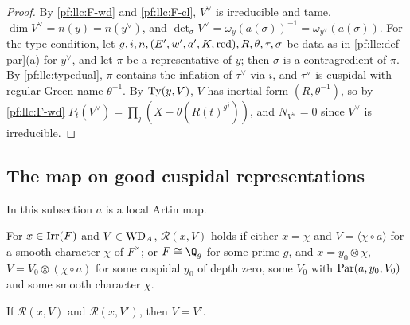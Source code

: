 \begin{proof}
By \ref{pf:llc:F-wd} and \ref{pf:llc:F-cl}, $V^\vee$ is irreducible and tame, $\dim V^\vee=n(y)=n(y^\vee)$, and
$\det_\sigma V^\vee=\omega_y(a(\sigma))^{-1}=\omega_{y^\vee}(a(\sigma))$. For the type condition, let
$g,i,n,(E',w',a',K,\operatorname{red}),R,\theta,\tau,\sigma$ be data as in \cref{pf:llc:def-par}(a) for $y^\vee$, and let $\pi$ be a
representative of $y$; then $\sigma$ is a contragredient of $\pi$. By \cref{pf:llc:typedual}, $\pi$ contains the
inflation of $\tau^\vee$ via $i$, and $\tau^\vee$ is cuspidal with regular Green name $\theta^{-1}$. By $\operatorname{Ty}(y,V)$, $V$
has inertial form $(R,\theta^{-1})$, so by \ref{pf:llc:F-wd} $P_t(V^\vee)=\prod_j(X-\theta(R(t)^{g^j}))$, and
$N_{V^\vee}=0$ since $V^\vee$ is irreducible.
\end{proof}

\subsection{The map on good cuspidal representations}\label{pf:llc:sec-good}

In this subsection $a$ is a local Artin map.

\begin{definition}\label{pf:llc:def-rel}
For $x\in\operatorname{Irr}(F)$ and $V\in\mathrm{WD}_A$, $\mathcal R(x,V)$ holds if either $x=\chi$ and $V=\langle\chi\circ a\rangle$ for
a smooth character $\chi$ of $F^\times$; or $F\cong\Q_g$ for some prime $g$, and $x=y_0\otimes\chi$,
$V=V_0\otimes(\chi\circ a)$ for some cuspidal $y_0$ of depth zero, some $V_0$ with $\operatorname{Par}(a,y_0,V_0)$ and some
smooth character $\chi$. 
\end{definition}

\begin{lemma}\label{pf:llc:relunique}
If $\mathcal R(x,V)$ and $\mathcal R(x,V')$, then $V=V'$. 
\end{lemma}

